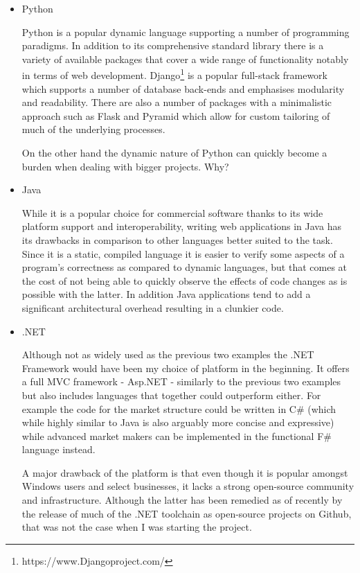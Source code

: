 \documentclass[bsc,frontabs,twoside,singlespacing,parskip,deptreport]{infthesis}     %
\begin{document}
\begin{itemize}
\item Python

Python is a popular dynamic language supporting a number of programming paradigms. In addition to its comprehensive standard library there is a variety of available packages that cover a wide range of functionality notably in terms of web development. Django\footnote{https://www.Djangoproject.com/} is a popular full-stack framework which supports a number of database back-ends and emphasises modularity and readability. There are also a number of packages with a minimalistic approach such as Flask and Pyramid which allow for custom tailoring of much of the underlying processes. 

On the other hand the dynamic nature of Python can quickly become a burden when dealing with bigger projects. Why?

\item Java

While it is a popular choice for commercial software thanks to its wide platform support and interoperability, writing web applications in Java has its drawbacks in comparison to other languages better suited to the task. Since it is a static, compiled language it is easier to verify some aspects of a program's correctness as compared to dynamic languages, but that comes at the cost of not being able to quickly observe the effects of code changes as is possible with the latter. In addition Java applications tend to add a significant architectural overhead resulting in a clunkier code. 

\item .NET

	Although not as widely used as the previous two examples the .NET Framework would have been my choice of platform in the beginning. It offers a full MVC framework - Asp.NET -  similarly to the previous two examples but also includes languages that together could outperform either. For example the code for the market structure could be written in C\# (which while highly similar to Java is also arguably more concise and expressive) while advanced market makers can be implemented in the functional F\# language instead. 

	A major drawback of the platform is that even though it is popular amongst Windows users and select businesses, it lacks a strong open-source community and infrastructure. Although the latter has been remedied as of recently by the release of much of the .NET toolchain as open-source projects on Github, that was not the case when I was starting the project. 

\end{itemize}
\end{document}
